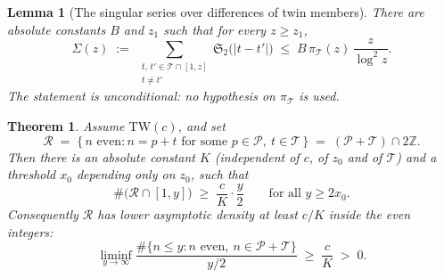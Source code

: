 \documentclass[10pt,a4paper]{amsart}
\newtheorem{theorem}{Theorem}
\newtheorem{lemma}{Lemma}
\newcommand{\PP}{\mathcal{P}}
\newcommand{\T}{\mathcal{T}}
\begin{document}
\begin{lemma}[The singular series over differences of twin members]
\label{lem:crux}
There are absolute constants $B$ and $z_1$ such that for every $z \ge z_1$,
\[
  \Sigma(z) \;:=\;
  \sum_{\substack{t,\, t' \in \T \cap [1,z] \\ t \ne t'}}
    \mathfrak{S}_2\bigl(|t - t'|\bigr)
  \;\le\; B\,\pi_\T(z)\,\frac{z}{\log^{2} z}.
\]
The statement is unconditional: no hypothesis on $\pi_\T$ is used.
\end{lemma}

\begin{theorem}\label{thm:romanov}
Assume $\mathrm{TW}(c)$, and set
\[
  \mathcal{R} \;=\; \{\, n \text{ even} : n = p + t
    \text{ for some } p \in \PP,\ t \in \T \,\}
  \;=\; (\PP + \T) \cap 2\mathbb{Z}.
\]
Then there is an absolute constant $K$ (independent of $c$, of $z_0$ and of
$\T$) and a threshold $x_0$ depending only on $z_0$, such that
\[
  \#\bigl(\mathcal{R} \cap [1, y]\bigr) \;\ge\; \frac{c}{K}\cdot\frac{y}{2}
  \qquad\text{for all } y \ge 2x_0 .
\]
Consequently $\mathcal{R}$ has lower asymptotic density at least $c/K$ inside
the even integers:
\[
  \liminf_{y \to \infty}
  \frac{\#\{n \le y : n \text{ even},\ n \in \PP + \T\}}{y/2}
  \;\ge\; \frac{c}{K} \;>\; 0 .
\]
\end{theorem}
\end{document}
